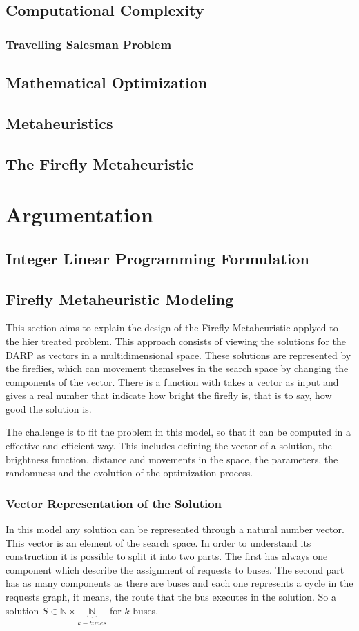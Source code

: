 \documentclass[tuberlin,cic,tc,openright,english,noabntcite]{iiufrgs}
\begin{document}
\section{Computational Complexity}
\subsection{Travelling Salesman Problem}
\section{Mathematical Optimization}
\section{Metaheuristics}
\section{The Firefly Metaheuristic}

\chapter{Argumentation}
\section{Integer Linear Programming Formulation}
\section{Firefly Metaheuristic Modeling}
This section aims to explain the design of the Firefly Metaheuristic applyed to the hier treated problem. This approach consists of viewing the solutions for the DARP as vectors in a multidimensional space. These solutions are represented by the fireflies, which can movement themselves in the search space by changing the components of the vector. There is a function with takes a vector as input and gives a real number that indicate how bright the firefly is, that is to say, how good the solution is.

The challenge is to fit the problem in this model, so that it can be computed in a effective and efficient way. This includes defining the vector of a solution, the brightness function, distance and movements in the space, the parameters, the randomness and the evolution of the optimization process.

\subsection{Vector Representation of the Solution}
In this model any solution can be represented through a natural number vector. This vector is an element of the search space. In order to understand its construction it is possible to split it into two parts. The first has always one component which describe the assignment of requests to buses. The second part has as many components as there are buses and each one represents a cycle in the requests graph, it means, the route that the bus executes in the solution. So a solution $S \in \mathbb{N} \times \underbrace{\mathbb{N}}_{k-times}$ for $k$ buses.
\end{document}
